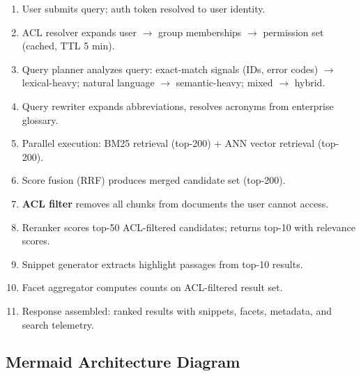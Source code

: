 \begin{enumerate}
  \item User submits query; auth token resolved to user identity.
  \item ACL resolver expands user $\rightarrow$ group memberships $\rightarrow$ permission set (cached, TTL 5 min).
  \item Query planner analyzes query: exact-match signals (IDs, error codes) $\rightarrow$ lexical-heavy; natural language $\rightarrow$ semantic-heavy; mixed $\rightarrow$ hybrid.
  \item Query rewriter expands abbreviations, resolves acronyms from enterprise glossary.
  \item Parallel execution: BM25 retrieval (top-200) + ANN vector retrieval (top-200).
  \item Score fusion (RRF) produces merged candidate set (top-200).
  \item \textbf{ACL filter} removes all chunks from documents the user cannot access.
  \item Reranker scores top-50 ACL-filtered candidates; returns top-10 with relevance scores.
  \item Snippet generator extracts highlight passages from top-10 results.
  \item Facet aggregator computes counts on ACL-filtered result set.
  \item Response assembled: ranked results with snippets, facets, metadata, and search telemetry.
\end{enumerate}

\subsection*{Mermaid Architecture Diagram}

